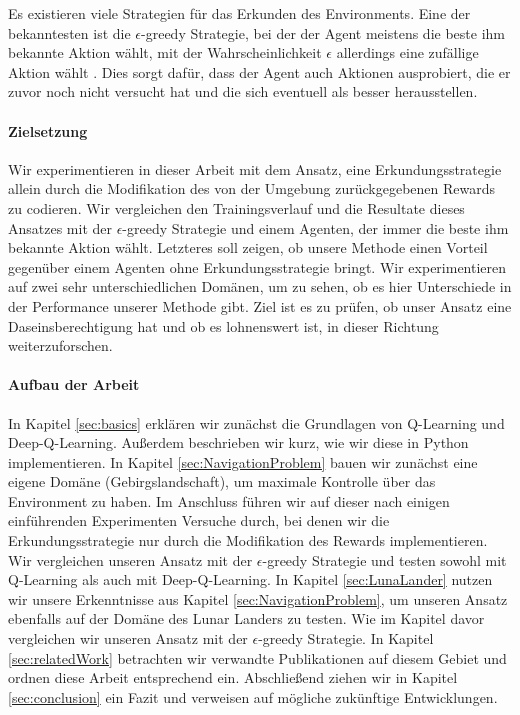 Es existieren viele Strategien für das Erkunden des Environments. Eine der bekanntesten ist die $ \epsilon $-greedy Strategie, bei der der Agent meistens die beste ihm bekannte Aktion wählt, mit der Wahrscheinlichkeit $ \epsilon $ allerdings eine zufällige Aktion wählt \cite{07_dabney2020temporallyextended, 06_sutton2018reinforcement}. Dies sorgt dafür, dass der Agent auch Aktionen ausprobiert, die er zuvor noch nicht versucht hat und die sich eventuell als besser herausstellen.

\paragraph{Zielsetzung}
Wir experimentieren in dieser Arbeit mit dem Ansatz, eine Erkundungsstrategie allein durch die Modifikation des von der Umgebung zurückgegebenen Rewards zu codieren. Wir vergleichen den Trainingsverlauf und die Resultate dieses Ansatzes mit der $ \epsilon $-greedy Strategie und einem Agenten, der immer die beste ihm bekannte Aktion wählt. Letzteres soll zeigen, ob unsere Methode einen Vorteil gegenüber einem Agenten ohne Erkundungsstrategie bringt. Wir experimentieren auf zwei sehr unterschiedlichen Domänen, um zu sehen, ob es hier Unterschiede in der Performance unserer Methode gibt. Ziel ist es zu prüfen, ob unser Ansatz eine Daseinsberechtigung hat und ob es lohnenswert ist, in dieser Richtung weiterzuforschen.

\paragraph{Aufbau der Arbeit}
In Kapitel \ref{sec:basics} erklären wir zunächst die Grundlagen von Q-Learning und Deep-Q-Learning. Außerdem beschrieben wir kurz, wie wir diese in Python implementieren. In Kapitel \ref{sec:NavigationProblem} bauen wir zunächst eine eigene Domäne (Gebirgslandschaft), um maximale Kontrolle über das Environment zu haben. Im Anschluss führen wir auf dieser nach einigen einführenden Experimenten Versuche durch, bei denen wir die Erkundungsstrategie nur durch die Modifikation des Rewards implementieren. Wir vergleichen unseren Ansatz mit der $ \epsilon $-greedy Strategie und testen sowohl mit Q-Learning als auch mit Deep-Q-Learning. In Kapitel \ref{sec:LunaLander} nutzen wir unsere Erkenntnisse aus Kapitel \ref{sec:NavigationProblem}, um unseren Ansatz ebenfalls auf der Domäne des Lunar Landers zu testen. Wie im Kapitel davor vergleichen wir unseren Ansatz mit der $ \epsilon $-greedy Strategie. In Kapitel \ref{sec:relatedWork} betrachten wir verwandte Publikationen auf diesem Gebiet und ordnen diese Arbeit entsprechend ein. Abschließend ziehen wir in Kapitel \ref{sec:conclusion} ein Fazit und verweisen auf mögliche zukünftige Entwicklungen.